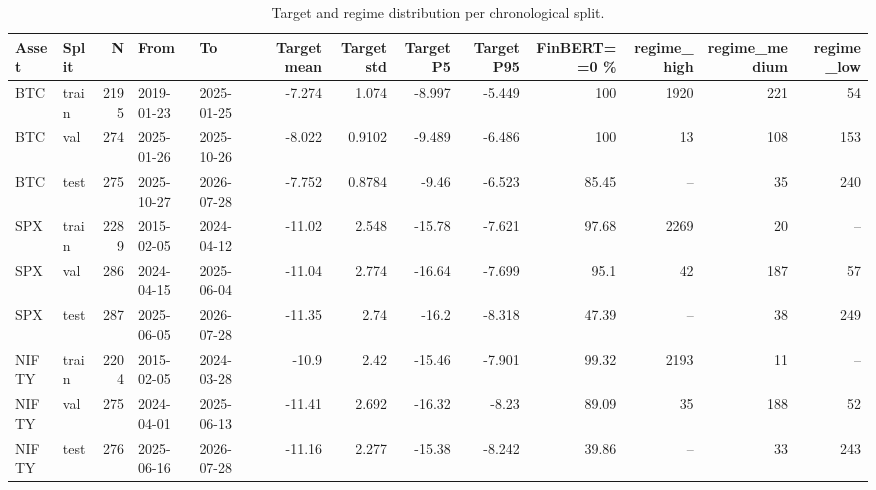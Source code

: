 \begin{table}[htbp]
\centering
\caption{Target and regime distribution per chronological split.}
\label{tab:t4_split_distribution}
\begin{tabular}{llrllrrrrrrrr}
\toprule
Asset & Split & N & From & To & Target mean & Target std & Target P5 & Target P95 & FinBERT==0 \% & regime\_high & regime\_medium & regime\_low \\
\midrule
BTC & train & 2195 & 2019-01-23 & 2025-01-25 & -7.274 & 1.074 & -8.997 & -5.449 & 100 & 1920 & 221 & 54 \\
BTC & val & 274 & 2025-01-26 & 2025-10-26 & -8.022 & 0.9102 & -9.489 & -6.486 & 100 & 13 & 108 & 153 \\
BTC & test & 275 & 2025-10-27 & 2026-07-28 & -7.752 & 0.8784 & -9.46 & -6.523 & 85.45 & -- & 35 & 240 \\
SPX & train & 2289 & 2015-02-05 & 2024-04-12 & -11.02 & 2.548 & -15.78 & -7.621 & 97.68 & 2269 & 20 & -- \\
SPX & val & 286 & 2024-04-15 & 2025-06-04 & -11.04 & 2.774 & -16.64 & -7.699 & 95.1 & 42 & 187 & 57 \\
SPX & test & 287 & 2025-06-05 & 2026-07-28 & -11.35 & 2.74 & -16.2 & -8.318 & 47.39 & -- & 38 & 249 \\
NIFTY & train & 2204 & 2015-02-05 & 2024-03-28 & -10.9 & 2.42 & -15.46 & -7.901 & 99.32 & 2193 & 11 & -- \\
NIFTY & val & 275 & 2024-04-01 & 2025-06-13 & -11.41 & 2.692 & -16.32 & -8.23 & 89.09 & 35 & 188 & 52 \\
NIFTY & test & 276 & 2025-06-16 & 2026-07-28 & -11.16 & 2.277 & -15.38 & -8.242 & 39.86 & -- & 33 & 243 \\
\bottomrule
\end{tabular}
\end{table}
